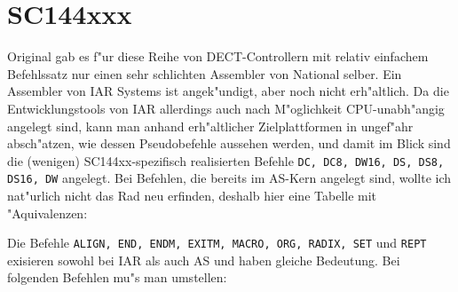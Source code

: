 \documentclass[12pt,a4paper,twoside]{report}
\newcommand{\tty}[1]{{\tt #1}}
\begin{document}

\section{SC144xxx}
\label{SC144xxspec}

Original gab es f"ur diese Reihe von DECT-Controllern mit relativ
einfachem Befehlssatz nur einen sehr schlichten Assembler von National
selber.  Ein Assembler von IAR Systems ist angek"undigt, aber noch nicht
erh"altlich.  Da die Entwicklungstools von IAR allerdings auch nach
M"oglichkeit CPU-unabh"angig angelegt sind, kann man anhand erh"altlicher
Zielplattformen in ungef"ahr absch"atzen, wie dessen Pseudobefehle
aussehen werden, und damit im Blick sind die (wenigen) SC144xx-spezifisch
realisierten Befehle {\tt DC, DC8, DW16, DS, DS8, DS16, DW} angelegt. Bei
Befehlen, die bereits im AS-Kern angelegt sind, wollte ich nat"urlich
nicht das Rad neu erfinden, deshalb hier eine Tabelle mit "Aquivalenzen:

Die Befehle \tty{ALIGN, END, ENDM, EXITM, MACRO, ORG, RADIX, SET} und
\tty{REPT} exisieren sowohl bei IAR als auch AS und haben gleiche
Bedeutung.  Bei folgenden Befehlen mu"s man umstellen:
\end{document}
